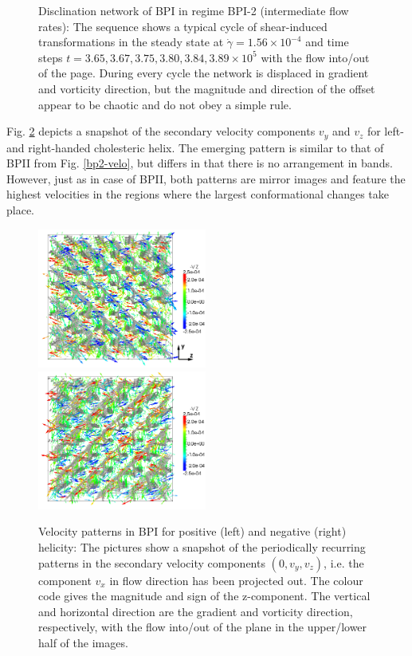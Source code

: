\documentclass[aps,pre,reprint,superscriptaddress, twocolumn]{revtex4}
\newcommand{\e}[1]{\times10^{#1}}
\newcommand{\gd}{\dot{\gamma}}
\begin{document}
\begin{figure}[htpb]
\caption{Disclination network of BPI in regime BPI-2 (intermediate flow rates): 
The sequence shows a typical cycle of shear-induced transformations in the 
steady state at $\gd=1.56\e{-4}$ and time steps 
$t=3.65, 3.67,3.75,3.80,3.84,3.89\e{5}$ with the flow into/out of the page. 
During every cycle the network is displaced in gradient and vorticity direction, 
but the magnitude and direction of the offset appear to be chaotic and do not 
obey a simple rule.}
\label{bp1-med}
\end{figure}

Fig. \ref{bp1-velo} depicts a snapshot of the secondary velocity 
components $v_y$ and $v_z$ for left- and right-handed cholesteric
helix. The emerging pattern is similar to that of BPII from 
Fig. \ref{bp2-velo}, but differs in that there is no
arrangement in bands. However, just as in case of BPII, both patterns
are mirror images and feature the highest velocities in the regions where 
the largest conformational changes take place. 

\begin{figure}[htpb]
\includegraphics[width=0.495\textwidth]{v_yz-v_z-360k_run914.png}
\includegraphics[width=0.495\textwidth]{v_yz-v_z-360k_run922.png}
\caption{Velocity patterns in BPI for positive (left) and negative (right) helicity: 
The pictures show a snapshot of the periodically recurring patterns in the 
secondary velocity components $(0,v_y,v_z)$, i.e. the component $v_x$ in flow direction 
has been projected out. The colour code gives the magnitude and sign 
of the z-component. The vertical and horizontal direction are the gradient and 
vorticity direction, respectively, with the flow into/out of the plane in the 
upper/lower half of the images.}
\label{bp1-velo}
\end{figure}
\end{document}
